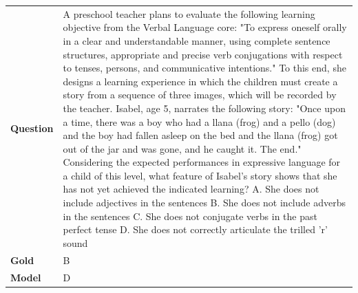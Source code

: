 \begin{longtable}{@{}l p{13cm}@{}}
  \textbf{Question}  & A preschool teacher plans to evaluate the following learning objective from the Verbal Language core: "To express oneself orally in a clear and understandable manner, using complete sentence structures, appropriate and precise verb conjugations with respect to tenses, persons, and communicative intentions." To this end, she designs a learning experience in which the children must create a story from a sequence of three images, which will be recorded by the teacher. Isabel, age 5, narrates the following story: "Once upon a time, there was a boy who had a llana (frog) and a pello (dog) and the boy had fallen asleep on the bed and the llana (frog) got out of the jar and was gone, and he caught it. The end." Considering the expected performances in expressive language for a child of this level, what feature of Isabel's story shows that she has not yet achieved the indicated learning? \newline A. She does not include adjectives in the sentences \newline B. She does not include adverbs in the sentences \newline C. She does not conjugate verbs in the past perfect tense \newline D. She does not correctly articulate the trilled 'r' sound   \\
  \textbf{Gold}      & B       \\
  \textbf{Model}     & D  \\

\end{longtable}
